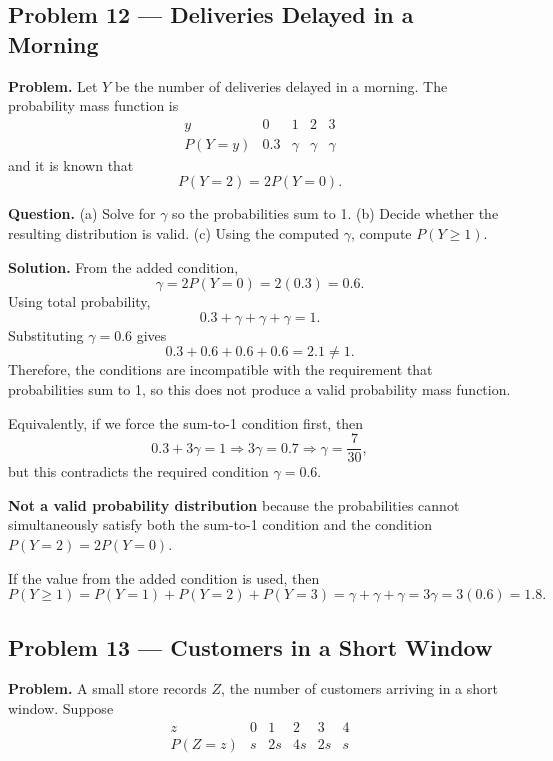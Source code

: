 \begin{ExamProblems}
		
		\item
		\subsection*{Problem 12 — Deliveries Delayed in a Morning}
			\textbf{Problem.}
		Let $Y$ be the number of deliveries delayed in a morning. The probability mass function is
		\[
		\begin{array}{c|cccc}
			y & 0 & 1 & 2 & 3\\
			\hline
			P(Y=y) & 0.3 & \gamma & \gamma & \gamma
		\end{array}
		\]
		and it is known that
		\[
		P(Y=2)=2P(Y=0).
		\]
		
		\textbf{Question.}
		(a) Solve for $\gamma$ so the probabilities sum to 1.
		(b) Decide whether the resulting distribution is valid.
		(c) Using the computed $\gamma$, compute $P(Y\ge 1)$.
		
		\textbf{Solution.}
		From the added condition,
		\[
		\gamma=2P(Y=0)=2(0.3)=0.6.
		\]
		Using total probability,
		\[
		0.3+\gamma+\gamma+\gamma=1.
		\]
		Substituting $\gamma=0.6$ gives
		\[
		0.3+0.6+0.6+0.6=2.1\neq 1.
		\]
		Therefore, the conditions are incompatible with the requirement that probabilities sum to 1, so this does not produce a valid probability mass function.
		
		Equivalently, if we force the sum-to-1 condition first, then
		\[
		0.3+3\gamma=1\Rightarrow 3\gamma=0.7\Rightarrow \gamma=\frac{7}{30},
		\]
		but this contradicts the required condition $\gamma=0.6$.
		
		\textbf{Not a valid probability distribution} because the probabilities cannot simultaneously satisfy both the sum-to-1 condition and the condition $P(Y=2)=2P(Y=0)$.
		
		If the value from the added condition is used, then
		\[
		P(Y\ge 1)=P(Y=1)+P(Y=2)+P(Y=3)=\gamma+\gamma+\gamma=3\gamma=3(0.6)=1.8.
		\]
		
		
		\item
		\subsection*{Problem 13 — Customers in a Short Window}
		
		\textbf{Problem.}
		A small store records $Z$, the number of customers arriving in a short window. Suppose
		\[
		\begin{array}{c|ccccc}
			z & 0 & 1 & 2 & 3 & 4\\
			\hline
			P(Z=z) & s & 2s & 4s & 2s & s
		\end{array}
		\]
		

\end{ExamProblems}
